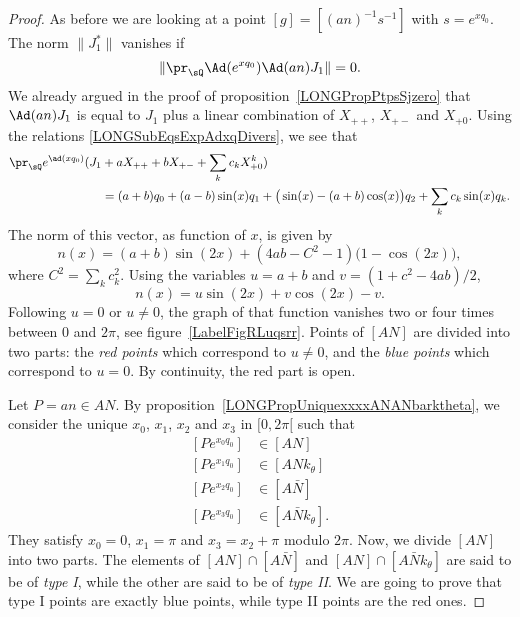 \begin{proof}
    As before we are looking at a point $[g]=[(an)^{-1}s^{-1}]$ with $s= e^{xq_0}$. The norm $\| J_1^* \|$ vanishes if
    \begin{equation}
        \| \pr_{\sQ} \Ad( e^{xq_0})\Ad(an)J_1 \|=0.
    \end{equation}
    We already argued in the proof of proposition~\ref{LONGPropPtpsSjzero} that $\Ad(an)J_1$ is equal to $J_1$ plus a linear combination of $X_{++}$, $X_{+-}$ and $X_{+0}$. Using the relations \eqref{LONGSubEqsExpAdxqDivers}, we see that
    \begin{equation}        \label{LONGEqprQexpxqzXanroots}
        \begin{aligned}[]
            \pr_{\sQ} e^{\ad(xq_0)}(J_1&+aX_{++}+bX_{+-}+\sum_k c_kX^k_{+0})\\
                                &=(a+b)q_0+(a-b)\sin(x)q_1+\big( \sin(x)-(a+b)\cos(x) \big)q_2+\sum _k c_k\sin(x)q_k.
        \end{aligned}
    \end{equation}
    The norm of this vector, as function of $x$, is given by
    \begin{equation}
        n(x)=(a+b)\sin(2x)+(4ab-C^2-1)\big( 1-\cos(2x) \big),
    \end{equation}
    where $C^2=\sum_kc_k^2$. Using the variables $u=a+b$ and $v=(1+c^2-4ab)/2$,
    \begin{equation}
        n(x)=u\sin(2x)+v\cos(2x)-v.
    \end{equation}
    Following $u=0$ or $u\neq 0$, the graph of that function vanishes two or four times between $0$ and $2\pi$, see figure~\ref{LabelFigRLuqsrr}. Points of $[AN]$ are divided into two parts: the \emph{red points} which correspond to $u\neq 0$, and the \emph{blue points} which correspond to $u=0$. By continuity, the red part is open.


\newcommand{\CaptionFigRLuqsrr}{In red, the function $n(x)$ with $u\neq 0$ and in blue, the function with $u=0$.}


    Let $P=an\in AN$.
    By proposition~\ref{LONGPropUniquexxxxANANbarktheta}, we consider the unique  $x_0$, $x_1$, $x_2$ and $x_3$ in $\mathopen[ 0 , 2\pi [$ such that
\begin{subequations}
    \begin{align}
        [P e^{x_0q_0}]&\in[AN]\\
        [P e^{x_1q_0}]&\in[ANk_{\theta}]\\
        [P e^{x_2q_0}]&\in[A\bar N]\\
        [P e^{x_3q_0}]&\in[A\bar Nk_{\theta}].
    \end{align}
\end{subequations}
They satisfy $x_0=0$, $x_1=\pi$ and $x_3=x_2+\pi$ modulo $2\pi$. Now, we divide $[AN]$ into two parts. The elements of $[AN]\cap [A\bar N]$ and $[AN]\cap[A\bar Nk_{\theta}]$ are said to be of \emph{type I}, while the other are said to be of \emph{type II}. We are going to prove that type I points are exactly blue points, while type II points are the red ones.


\end{proof}
